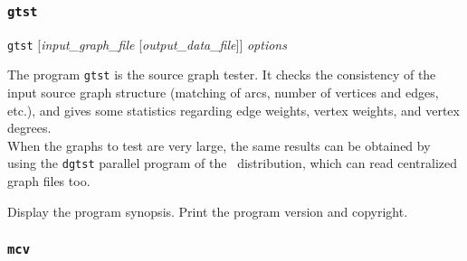 \subsubsection{\texttt{gtst}}

\begin{itemize}
\progsyn
\texttt{gtst} [{\it input\_graph\_file} [{\it output\_data\_file}]] {\it options}

\progdes
The program \texttt{gtst} is the source graph tester. It checks the
consistency of the input source graph structure (matching of arcs,
number of vertices and edges, etc\@.), and gives some statistics
regarding edge weights, vertex weights, and vertex degrees.
\\

When the graphs to test are very large, the same results can
be obtained by using the \texttt{dgtst} parallel program of the
\ptscotch\ distribution, which can read centralized graph
files too.

\progopt
\begin{itemize}
\iteme[\texttt{-h}]
Display the program synopsis.
\iteme[\texttt{-V}]
Print the program version and copyright.
\end{itemize}
\end{itemize}

\subsubsection{\texttt{mcv}}
\label{sec-prog-mcv}

